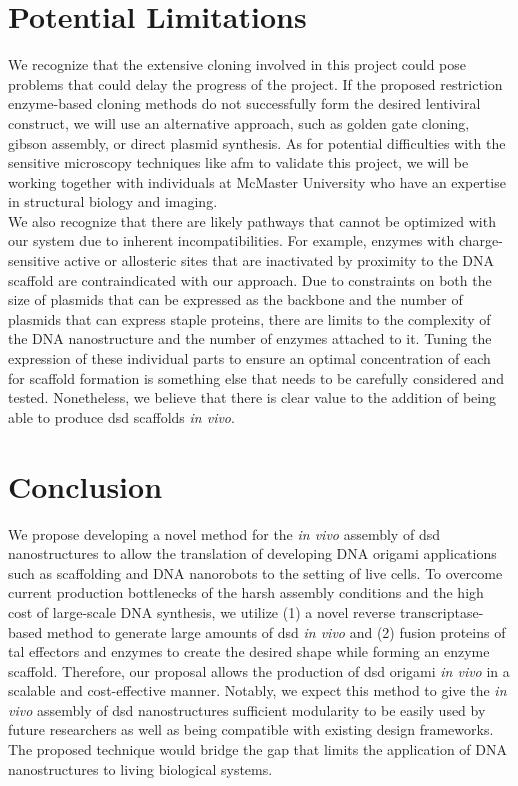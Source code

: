 \documentclass[a4paper]{article}
\begin{document}
\section*{Potential Limitations}
We recognize that the extensive cloning involved in this project could pose problems that could delay the progress of the project.
If the proposed restriction enzyme-based cloning methods do not successfully form the desired lentiviral construct, we will use an alternative approach, such as golden gate cloning, gibson assembly, or direct plasmid synthesis.
As for potential difficulties with the sensitive microscopy techniques like \ac{afm} to validate this project, we will be working together with individuals at McMaster University who have an expertise in structural biology and imaging.
\vspace{2 mm}
\\
We also recognize that there are likely pathways that cannot be optimized with our system due to inherent incompatibilities.
For example, enzymes with charge-sensitive active or allosteric sites that are inactivated by proximity to the DNA scaffold are contraindicated with our approach\cite{meth7}.
Due  to constraints on both the size of plasmids that can be expressed as the backbone and the number of plasmids that can express staple proteins, there are limits to the complexity of the DNA nanostructure and the number of enzymes attached to it.
Tuning the expression of these individual parts to ensure an optimal concentration of each for scaffold formation is something else that needs to be carefully considered and tested.
Nonetheless, we believe that there is clear value to the addition of being able to produce \ac{dsd} scaffolds \textit{in vivo}.

\section*{Conclusion}
We propose developing a novel method for the \textit{in vivo} assembly of \ac{dsd} nanostructures to allow the translation of developing DNA origami applications such as scaffolding and DNA nanorobots to the setting of live cells.
To overcome current production bottlenecks of the harsh assembly conditions and the high cost of large-scale DNA synthesis, we utilize (1) a novel reverse transcriptase-based method to generate large amounts of \ac{dsd} \textit{in vivo} and (2) fusion proteins of \ac{tal} effectors and enzymes to create the desired shape while forming an enzyme scaffold.
Therefore, our proposal allows the production of \ac{dsd} origami \textit{in vivo} in a scalable and cost-effective manner.
Notably, we expect this method to give the \textit{in vivo} assembly of \ac{dsd} nanostructures sufficient modularity to be easily used by future researchers as well as being compatible with existing design frameworks.
The proposed technique would bridge the gap that limits the application of DNA nanostructures to living biological systems.


\end{document}
